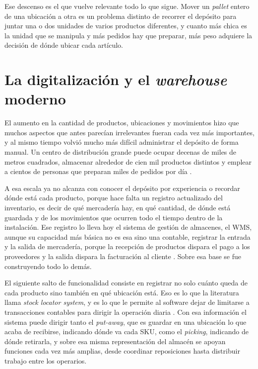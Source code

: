 Ese descenso es el que vuelve relevante todo lo que sigue.
Mover un \emph{pallet} entero de una ubicación a otra es un problema distinto de recorrer el depósito para juntar una o dos unidades de varios productos diferentes, y cuanto más chica es la unidad que se manipula y más pedidos hay que preparar, más peso adquiere la decisión de dónde ubicar cada artículo.

\section{La digitalización y el \emph{warehouse} moderno}
\label{sec:digitalizacion}

El aumento en la cantidad de productos, ubicaciones y movimientos hizo que muchos aspectos que antes parecían irrelevantes fueran cada vez más importantes, y al mismo tiempo volvió mucho más difícil administrar el depósito de forma manual.
Un centro de distribución grande puede ocupar decenas de miles de metros cuadrados, almacenar alrededor de cien mil productos distintos y emplear a cientos de personas que preparan miles de pedidos por día \citep[capítulo~4]{bartholdi2014warehouse}.

A esa escala ya no alcanza con conocer el depósito por experiencia o recordar dónde está cada producto, porque hace falta un registro actualizado del inventario, es decir de qué mercadería hay, en qué cantidad, de dónde está guardada y de los movimientos que ocurren todo el tiempo dentro de la instalación.
Ese registro lo lleva hoy el sistema de gestión de almacenes, el \gls{WMS}, aunque su capacidad más básica no es esa sino una contable, registrar la entrada y la salida de mercadería, porque la recepción de productos dispara el pago a los proveedores y la salida dispara la facturación al cliente \citep[sección~4.1]{bartholdi2014warehouse}.
Sobre esa base se fue construyendo todo lo demás.

El siguiente salto de funcionalidad consiste en registrar no solo cuánto queda de cada producto sino también en qué ubicación está.
Eso es lo que la literatura llama \emph{stock locator system}, y es lo que le permite al software dejar de limitarse a transacciones contables para dirigir la operación diaria \citep[sección~4.2]{bartholdi2014warehouse}.
Con esa información el sistema puede dirigir tanto el \emph{put-away}, que es guardar en una ubicación lo que acaba de recibirse, indicando dónde va cada SKU, como el \emph{picking}, indicando de dónde retirarla, y sobre esa misma representación del almacén se apoyan funciones cada vez más amplias, desde coordinar reposiciones hasta distribuir trabajo entre los operarios.

